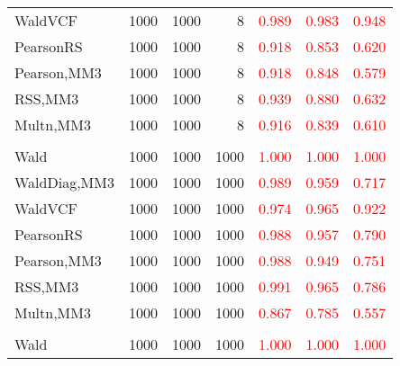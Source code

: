 \documentclass[
]{article}
\begin{document}
\begin{table}[H]
{\begin{tabular}[t]{lrrrrrr}
\hspace{1em}WaldVCF & 1000 & 1000 & 8 & \textcolor{red}{0.989} & \textcolor{red}{0.983} & \textcolor{red}{0.948}\\
\hspace{1em}PearsonRS & 1000 & 1000 & 8 & \textcolor{red}{0.918} & \textcolor{red}{0.853} & \textcolor{red}{0.620}\\
\hspace{1em}Pearson,MM3 & 1000 & 1000 & 8 & \textcolor{red}{0.918} & \textcolor{red}{0.848} & \textcolor{red}{0.579}\\
\hspace{1em}RSS,MM3 & 1000 & 1000 & 8 & \textcolor{red}{0.939} & \textcolor{red}{0.880} & \textcolor{red}{0.632}\\
\hspace{1em}Multn,MM3 & 1000 & 1000 & 8 & \textcolor{red}{0.916} & \textcolor{red}{0.839} & \textcolor{red}{0.610}\\
\addlinespace[0.3em]
\multicolumn{7}{l}{\textbf{1F 15V}}\\
\hspace{1em}Wald & 1000 & 1000 & 1000 & \textcolor{red}{1.000} & \textcolor{red}{1.000} & \vphantom{2} \textcolor{red}{1.000}\\
\hspace{1em}WaldDiag,MM3 & 1000 & 1000 & 1000 & \textcolor{red}{0.989} & \textcolor{red}{0.959} & \textcolor{red}{0.717}\\
\hspace{1em}WaldVCF & 1000 & 1000 & 1000 & \textcolor{red}{0.974} & \textcolor{red}{0.965} & \textcolor{red}{0.922}\\
\hspace{1em}PearsonRS & 1000 & 1000 & 1000 & \textcolor{red}{0.988} & \textcolor{red}{0.957} & \textcolor{red}{0.790}\\
\hspace{1em}Pearson,MM3 & 1000 & 1000 & 1000 & \textcolor{red}{0.988} & \textcolor{red}{0.949} & \textcolor{red}{0.751}\\
\hspace{1em}RSS,MM3 & 1000 & 1000 & 1000 & \textcolor{red}{0.991} & \textcolor{red}{0.965} & \textcolor{red}{0.786}\\
\hspace{1em}Multn,MM3 & 1000 & 1000 & 1000 & \textcolor{red}{0.867} & \textcolor{red}{0.785} & \textcolor{red}{0.557}\\
\addlinespace[0.3em]
\multicolumn{7}{l}{\textbf{2F 10V}}\\
\hspace{1em}Wald & 1000 & 1000 & 1000 & \textcolor{red}{1.000} & \textcolor{red}{1.000} & \vphantom{1} \textcolor{red}{1.000}\\

\end{tabular}}
\end{table}
\end{document}
